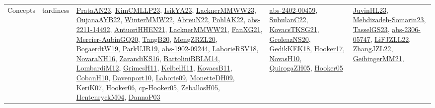 {\begin{longtable}{lp{3cm}>{\raggedright}p{6cm}>{\raggedright}p{6cm}p{8cm}}
Concepts & tardiness & \href{articles/PrataAN23.pdf}{PrataAN23}\cite{PrataAN23}, \href{papers/KimCMLLP23.pdf}{KimCMLLP23}\cite{KimCMLLP23}, \href{articles/IsikYA23.pdf}{IsikYA23}\cite{IsikYA23}, \href{articles/LacknerMMWW23.pdf}{LacknerMMWW23}\cite{LacknerMMWW23}, \href{papers/OujanaAYB22.pdf}{OujanaAYB22}\cite{OujanaAYB22}, \href{papers/WinterMMW22.pdf}{WinterMMW22}\cite{WinterMMW22}, \href{articles/AbreuN22.pdf}{AbreuN22}\cite{AbreuN22}, \href{articles/PohlAK22.pdf}{PohlAK22}\cite{PohlAK22}, \href{articles/abs-2211-14492.pdf}{abs-2211-14492}\cite{abs-2211-14492}, \href{papers/AntuoriHHEN21.pdf}{AntuoriHHEN21}\cite{AntuoriHHEN21}, \href{papers/LacknerMMWW21.pdf}{LacknerMMWW21}\cite{LacknerMMWW21}, \href{articles/FanXG21.pdf}{FanXG21}\cite{FanXG21}, \href{papers/Mercier-AubinGQ20.pdf}{Mercier-AubinGQ20}\cite{Mercier-AubinGQ20}, \href{papers/TangB20.pdf}{TangB20}\cite{TangB20}, \href{articles/MengZRZL20.pdf}{MengZRZL20}\cite{MengZRZL20}, \href{papers/BogaerdtW19.pdf}{BogaerdtW19}\cite{BogaerdtW19}, \href{papers/ParkUJR19.pdf}{ParkUJR19}\cite{ParkUJR19}, \href{articles/abs-1902-09244.pdf}{abs-1902-09244}\cite{abs-1902-09244}, \href{articles/LaborieRSV18.pdf}{LaborieRSV18}\cite{LaborieRSV18}, \href{articles/NovaraNH16.pdf}{NovaraNH16}\cite{NovaraNH16}, \href{articles/ZarandiKS16.pdf}{ZarandiKS16}\cite{ZarandiKS16}, \href{papers/BartoliniBBLM14.pdf}{BartoliniBBLM14}\cite{BartoliniBBLM14}, \href{articles/LombardiM12.pdf}{LombardiM12}\cite{LombardiM12}, \href{papers/GrimesH11.pdf}{GrimesH11}\cite{GrimesH11}, \href{articles/KelbelH11.pdf}{KelbelH11}\cite{KelbelH11}, \href{articles/KovacsB11.pdf}{KovacsB11}\cite{KovacsB11}, \href{papers/CobanH10.pdf}{CobanH10}\cite{CobanH10}, \href{papers/Davenport10.pdf}{Davenport10}\cite{Davenport10}, \href{papers/Laborie09.pdf}{Laborie09}\cite{Laborie09}, \href{papers/MonetteDH09.pdf}{MonetteDH09}\cite{MonetteDH09}, \href{papers/KeriK07.pdf}{KeriK07}\cite{KeriK07}, \href{articles/Hooker06.pdf}{Hooker06}\cite{Hooker06}, \href{papers/cp-Hooker05.pdf}{cp-Hooker05}\cite{cp-Hooker05}, \href{articles/ZeballosH05.pdf}{ZeballosH05}\cite{ZeballosH05}, \href{papers/HentenryckM04.pdf}{HentenryckM04}\cite{HentenryckM04}, \href{papers/DannaP03.pdf}{DannaP03}\cite{DannaP03} & \href{articles/abs-2402-00459.pdf}{abs-2402-00459}\cite{abs-2402-00459}, \href{articles/SubulanC22.pdf}{SubulanC22}\cite{SubulanC22}, \href{papers/KovacsTKSG21.pdf}{KovacsTKSG21}\cite{KovacsTKSG21}, \href{papers/GroleazNS20.pdf}{GroleazNS20}\cite{GroleazNS20}, \href{articles/GedikKEK18.pdf}{GedikKEK18}\cite{GedikKEK18}, \href{papers/Hooker17.pdf}{Hooker17}\cite{Hooker17}, \href{articles/NovasH10.pdf}{NovasH10}\cite{NovasH10}, \href{papers/QuirogaZH05.pdf}{QuirogaZH05}\cite{QuirogaZH05}, \href{articles/Hooker05.pdf}{Hooker05}\cite{Hooker05} & \href{papers/JuvinHL23.pdf}{JuvinHL23}\cite{JuvinHL23}, \href{papers/Mehdizadeh-Somarin23.pdf}{Mehdizadeh-Somarin23}\cite{Mehdizadeh-Somarin23}, \href{papers/TasselGS23.pdf}{TasselGS23}\cite{TasselGS23}, \href{articles/abs-2306-05747.pdf}{abs-2306-05747}\cite{abs-2306-05747}, \href{papers/LiFJZLL22.pdf}{LiFJZLL22}\cite{LiFJZLL22}, \href{papers/ZhangJZL22.pdf}{ZhangJZL22}\cite{ZhangJZL22}, \href{papers/GeibingerMM21.pdf}{GeibingerMM21}\cite{GeibingerMM21}, 
\end{longtable}}
